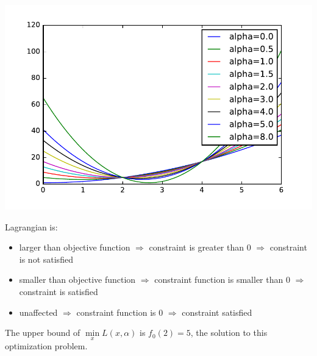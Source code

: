 \includegraphics{problems/code/prob6_fig.pdf}

Lagrangian is:
\begin{itemize}
	\item{larger than objective function $\Rightarrow$ constraint is greater than 0 $\Rightarrow$ constraint is not satisfied}
	\item{smaller than objective function $\Rightarrow$ constraint function is smaller than 0 $\Rightarrow$ constraint is satisfied}
	\item{unaffected $\Rightarrow$ constraint function is 0 $\Rightarrow$ constraint satisfied}
\end{itemize}

The upper bound of $\min\limits_x L(x,\alpha)$ is $f_0(2) = 5$, the solution to this optimization problem.

